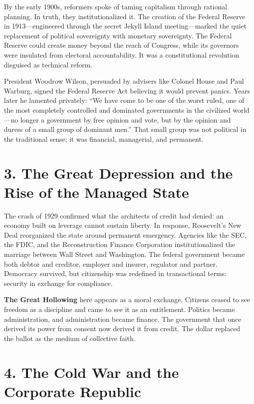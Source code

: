 \documentclass[11pt,twoside]{book}
\begin{document}
By the early 1900s, reformers spoke of taming capitalism through rational planning.  
In truth, they institutionalized it.  
The creation of the Federal Reserve in 1913—engineered through the secret Jekyll Island meeting—marked the quiet replacement of political sovereignty with monetary sovereignty.  
The Federal Reserve could create money beyond the reach of Congress, while its governors were insulated from electoral accountability.  
It was a constitutional revolution disguised as technical reform.

President Woodrow Wilson, persuaded by advisers like Colonel House and Paul Warburg, signed the Federal Reserve Act believing it would prevent panics.  
Years later he lamented privately: “We have come to be one of the worst ruled, one of the most completely controlled and dominated governments in the civilized world—no longer a government by free opinion and vote, but by the opinion and duress of a small group of dominant men.”  
That small group was not political in the traditional sense; it was financial, managerial, and permanent.

\section*{3. The Great Depression and the Rise of the Managed State}

The crash of 1929 confirmed what the architects of credit had denied: an economy built on leverage cannot sustain liberty.  
In response, Roosevelt’s New Deal reorganized the state around permanent emergency.  
Agencies like the SEC, the FDIC, and the Reconstruction Finance Corporation institutionalized the marriage between Wall Street and Washington.  
The federal government became both debtor and creditor, employer and insurer, regulator and partner.  
Democracy survived, but citizenship was redefined in transactional terms: security in exchange for compliance.

\textbf{The Great Hollowing} here appears as a moral exchange.  
Citizens ceased to see freedom as a discipline and came to see it as an entitlement.  
Politics became administration, and administration became finance.  
The government that once derived its power from consent now derived it from credit.  
The dollar replaced the ballot as the medium of collective faith.

\section*{4. The Cold War and the Corporate Republic}
\end{document}
